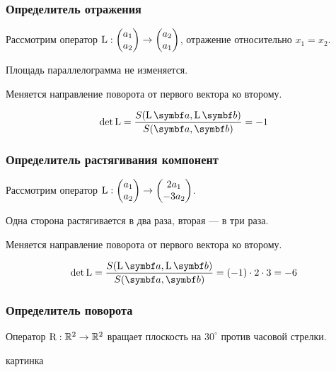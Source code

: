 \begin{frame}
\frametitle{Определитель отражения}


Рассмотрим оператор $\operatorname{L} : \begin{pmatrix}
  a_1 \\
  a_2 \\
\end{pmatrix} \to 
\begin{pmatrix}
  a_2 \\
  a_1 \\
\end{pmatrix}$, отражение относительно $x_1= x_2$.


\pause



    Площадь параллелограмма не изменяется. 


    Меняется направление поворота от первого вектора ко второму. 

    \pause

    \[
    \det \LL = \frac{S(\LL \ba, \LL \bb )}{S(\ba, \bb )} = -1
    \]

\end{frame}






\begin{frame}
    \frametitle{Определитель растягивания компонент}


    Рассмотрим оператор $\operatorname{L} : \begin{pmatrix}
      a_1 \\
      a_2 \\
    \end{pmatrix} \to 
    \begin{pmatrix}
      2a_1 \\
      -3a_2 \\
    \end{pmatrix}$.
    

    \pause

    Одна сторона растягивается в два раза, вторая — в три раза.


    Меняется направление поворота от первого вектора ко второму. 

    \pause

    \[
    \det \LL = \frac{S(\LL \ba, \LL \bb )}{S(\ba, \bb )} = (-1)\cdot 2\cdot 3 = -6
    \]

\end{frame}




\begin{frame}
    \frametitle{Определитель поворота}


    Оператор $\mathrm{R}: \mathbb{R}^2 \to \mathbb{R}^2$ вращает плоскость на $30^{\circ}$ против часовой стрелки.

    \pause

  картинка

\end{frame}



